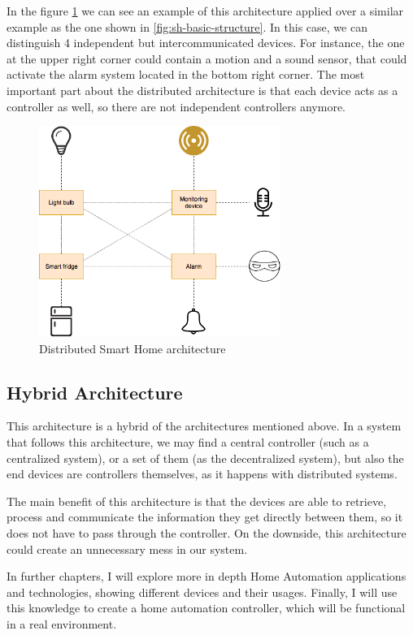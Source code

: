 In the figure \ref{fig:distributed-sh-architecture} we can see an example of this architecture applied over a similar example as the one
shown in \ref{fig:sh-basic-structure}. In this case, we can distinguish 4 independent but intercommunicated devices. For instance, 
the one at the upper right corner could contain a motion and a sound sensor, that could activate the alarm system located in the bottom
right corner. The most important part about the distributed architecture is that each device acts as a controller as well, so there are not
independent controllers anymore.

\begin{figure}
	\centering
	\includegraphics[width=0.7\textwidth]{images/Chapter_02/distributed-sh-architecture.png}
	\caption{Distributed Smart Home architecture}
	\label{fig:distributed-sh-architecture}
\end{figure}

\subsection{Hybrid Architecture}
This architecture is a hybrid of the architectures mentioned above. In a system that follows this architecture, we may find
a central controller (such as a centralized system), or a set of them (as the decentralized system), but also the end devices are
controllers themselves, as it happens with distributed systems.

The main benefit of this architecture is that the devices are able to retrieve, process and communicate the information they get
directly between them, so it does not have to pass through the controller. On the downside, this architecture could create an 
unnecessary mess in our system.

\bigskip
In further chapters, I will explore more in depth Home Automation applications and technologies, showing different devices and
their usages. Finally, I will use this knowledge to create a home automation controller, which will be functional in a real environment.
